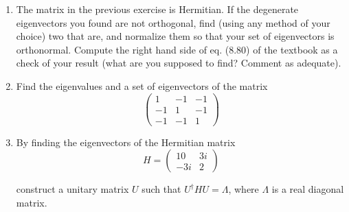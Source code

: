 \documentclass[fleqn]{article}
\begin{document}
\begin{enumerate}
    \item The matrix in the previous exercise is Hermitian. If the degenerate eigenvectors you found are not orthogonal, find (using any method of your choice) two that are, and normalize them so that your set of eigenvectors is orthonormal.
      Compute the right hand side of eq. (8.80) of the textbook as a check of your result (what are you supposed to find? Comment as adequate).

    \item Find the eigenvalues and a set of eigenvectors of the matrix
      $$ 
      \begin{pmatrix}
      1 & -1 & -1 \\
      -1 & 1 & -1 \\
      -1 & -1 & 1
      \end{pmatrix}
      $$

    
    \item By finding the eigenvectors of the Hermitian matrix
      $$H= 
      \begin{pmatrix}
      10 & 3i \\
      -3i & 2 
      \end{pmatrix}
      $$

      construct a unitary matrix $U$ such that $U^\dagger HU=\Lambda$, where $\Lambda$ is a real  diagonal matrix. 

  \end{enumerate}
\end{document}
